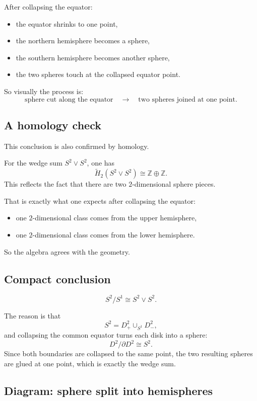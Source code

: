 \documentclass[12pt,a4paper]{article}
\theoremstyle{notespace}
\begin{document}
After collapsing the equator:
\begin{itemize}
	\item the equator shrinks to one point,
	\item the northern hemisphere becomes a sphere,
	\item the southern hemisphere becomes another sphere,
	\item the two spheres touch at the collapsed equator point.
\end{itemize}

So visually the process is:
\[
\text{sphere cut along the equator}
\quad\longrightarrow\quad
\text{two spheres joined at one point}.
\]

\subsection{A homology check}

This conclusion is also confirmed by homology.

For the wedge sum \(S^2\vee S^2\), one has
\[
\widetilde H_2(S^2\vee S^2)\cong \mathbb Z\oplus \mathbb Z.
\]
This reflects the fact that there are two \(2\)-dimensional sphere pieces.

That is exactly what one expects after collapsing the equator:
\begin{itemize}
	\item one \(2\)-dimensional class comes from the upper hemisphere,
	\item one \(2\)-dimensional class comes from the lower hemisphere.
\end{itemize}

So the algebra agrees with the geometry.

\subsection{Compact conclusion}

\[
\boxed{S^2/S^1 \cong S^2 \vee S^2.}
\]

The reason is that
\[
S^2=D^2_+\cup_{S^1}D^2_-,
\]
and collapsing the common equator turns each disk into a sphere:
\[
D^2/\partial D^2\cong S^2.
\]
Since both boundaries are collapsed to the same point, the two resulting spheres are glued at one point, which is exactly the wedge sum.

\bigskip

\subsection{Diagram: sphere split into hemispheres}
\end{document}
